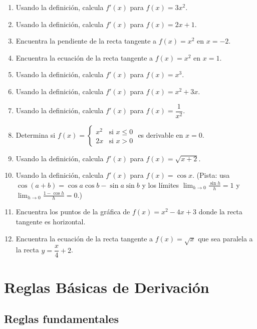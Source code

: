 \documentclass[12pt, a4paper]{article}
\begin{document}
\begin{enumerate}[leftmargin=*]
  \item \facil{} Usando la definición, calcula $f'(x)$ para $f(x) = 3x^2$.
  \item \facil{} Usando la definición, calcula $f'(x)$ para $f(x) = 2x + 1$.
  \item \facil{} Encuentra la pendiente de la recta tangente a $f(x) = x^2$ en $x = -2$.
  \item \facil{} Encuentra la ecuación de la recta tangente a $f(x) = x^2$ en $x = 1$.
  \item \medio{} Usando la definición, calcula $f'(x)$ para $f(x) = x^3$.
  \item \medio{} Usando la definición, calcula $f'(x)$ para $f(x) = x^2 + 3x$.
  \item \medio{} Usando la definición, calcula $f'(x)$ para $f(x) = \dfrac{1}{x^2}$.
  \item \medio{} Determina si $f(x) = \begin{cases} x^2 & \text{si } x \le 0 \\ 2x & \text{si } x > 0 \end{cases}$ es derivable en $x = 0$.
  \item \dificil{} Usando la definición, calcula $f'(x)$ para $f(x) = \sqrt{x + 2}$.
  \item \dificil{} Usando la definición, calcula $f'(x)$ para $f(x) = \cos x$. (Pista: usa $\cos(a + b) = \cos a \cos b - \sin a \sin b$ y los límites $\lim_{h \to 0} \frac{\sin h}{h} = 1$ y $\lim_{h \to 0} \frac{1 - \cos h}{h} = 0$.)
  \item \dificil{} Encuentra los puntos de la gráfica de $f(x) = x^2 - 4x + 3$ donde la recta tangente es horizontal.
  \item \dificil{} Encuentra la ecuación de la recta tangente a $f(x) = \sqrt{x}$ que sea paralela a la recta $y = \dfrac{x}{4} + 2$.
\end{enumerate}

\newpage

\section{Reglas Básicas de Derivación}

\subsection{Reglas fundamentales}
\end{document}

